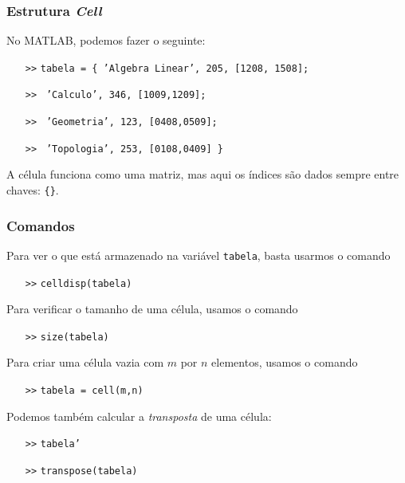 \documentclass{beamer}
\newcommand{\code}[1]{{\texttt{#1}}}
\newcommand{\acode}[1]{\alert{\texttt{#1}}}
\newcommand{\codigo}[1]{\begin{center}\rm{\code{
  \begin{tabular}{r l}
  #1
  \end{tabular}
  }}\end{center}}
\newcommand{\ac}{\alert{\texttt{>>}}}
\begin{document}
\begin{frame}
   \frametitle{Estrutura \emph{Cell}}
   No MATLAB, podemos fazer o seguinte:
   \begin{itemize}
     \item[\ac] \code{tabela = \{ 'Algebra Linear', 205, [1208, 1508];}
     \item[\ac] \code{\hskip2.2cm 'Calculo', 346, [1009,1209];}
     \item[\ac] \code{\hskip2.2cm 'Geometria', 123, [0408,0509];}
     \item[\ac] \code{\hskip2.2cm 'Topologia', 253, [0108,0409] \} }
   \end{itemize}
   A célula funciona como uma matriz, mas aqui os índices são dados sempre entre chaves: \code{\{\}}.
\end{frame}
\begin{frame}
  \frametitle{Comandos}
  Para ver o que está armazenado na variável \code{tabela}, basta usarmos o comando
  \begin{itemize}
    \item[\ac] \acode{celldisp}\code{(tabela)}
  \end{itemize}
  Para verificar o tamanho de uma célula, usamos o comando
  \begin{itemize}
    \item[\ac] \acode{size}\code{(tabela)}
  \end{itemize}
  Para criar uma célula vazia com $m$ por $n$ elementos, usamos o comando
  \begin{itemize}
    \item[\ac] \code{tabela = \acode{cell}(m,n)}
  \end{itemize}
  Podemos também calcular a \emph{transposta} de uma célula:
  \begin{itemize}
     \item[\ac] \code{tabela'}
     \item[\ac] \code{\acode{transpose}(tabela)}
  \end{itemize}
\end{frame}
\end{document}
